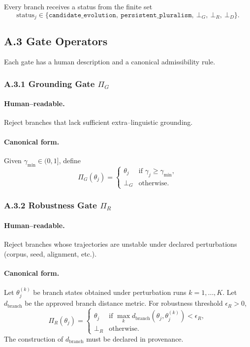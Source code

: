 \documentclass[11pt, a4paper]{article}
\begin{document}
Every branch receives a status from the finite set
\[
\mathrm{status}_j \in 
\{
\texttt{candidate\_evolution},\ 
\texttt{persistent\_pluralism},\ 
\bot_G,\ 
\bot_R,\ 
\bot_D
\}.
\]

\subsection*{A.3 \quad Gate Operators}
\label{sec:A3}

Each gate has a human description and a canonical admissibility rule.

\subsubsection*{A.3.1 \quad Grounding Gate $\Pi_G$}

\paragraph{Human–readable.}
Reject branches that lack sufficient extra–linguistic grounding.

\paragraph{Canonical form.}
Given $\gamma_{\min} \in (0,1]$, define
\[
\Pi_G(\theta_j) =
\begin{cases}
\theta_j & \text{if } \gamma_j \ge \gamma_{\min},\\[4pt]
\bot_G   & \text{otherwise.}
\end{cases}
\]

\subsubsection*{A.3.2 \quad Robustness Gate $\Pi_R$}

\paragraph{Human–readable.}
Reject branches whose trajectories are unstable under declared perturbations (corpus, seed, alignment, etc.).

\paragraph{Canonical form.}
Let $\theta_j^{(k)}$ be branch states obtained under perturbation runs $k=1,\dots,K$. Let $d_{\mathrm{branch}}$ be the approved branch distance metric. For robustness threshold $\epsilon_R > 0$,
\[
\Pi_R(\theta_j) =
\begin{cases}
\theta_j & \text{if } \max_k d_{\mathrm{branch}}(\theta_j, \theta_j^{(k)}) < \epsilon_R,\\[4pt]
\bot_R   & \text{otherwise.}
\end{cases}
\]
The construction of $d_{\mathrm{branch}}$ must be declared in provenance.
\end{document}
